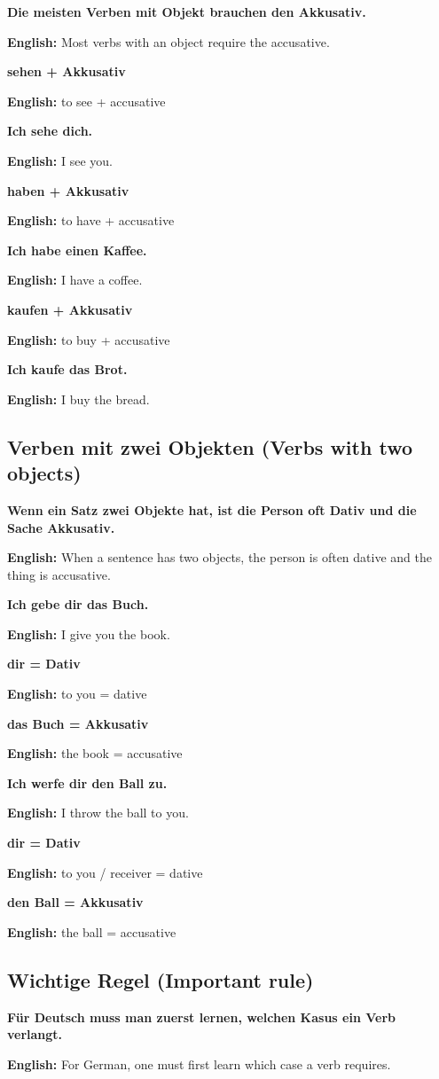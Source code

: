 \documentclass[a4paper,11pt]{article}
\newcommand{\EnglishText}[1]{{\small\color{SoftGray}\textbf{English: }#1\par}}
\newcommand{\EN}[1]{\EnglishText{#1}}
\begin{document}
            \textbf{Die meisten Verben mit Objekt brauchen den Akkusativ.}
            \EN{Most verbs with an object require the accusative.}
            
            \textbf{sehen + Akkusativ}
            \EN{to see + accusative}
            
            \textbf{Ich sehe dich.}
            \EN{I see you.}
            
            \textbf{haben + Akkusativ}
            \EN{to have + accusative}
            
            \textbf{Ich habe einen Kaffee.}
            \EN{I have a coffee.}
            
            \textbf{kaufen + Akkusativ}
            \EN{to buy + accusative}
            
            \textbf{Ich kaufe das Brot.}
            \EN{I buy the bread.}
        
        \subsection{Verben mit zwei Objekten \textnormal{(Verbs with two objects)}}
            
            \textbf{Wenn ein Satz zwei Objekte hat, ist die Person oft Dativ und die Sache Akkusativ.}
            \EN{When a sentence has two objects, the person is often dative and the thing is accusative.}
            
            \textbf{Ich gebe dir das Buch.}
            \EN{I give you the book.}
            
            \textbf{dir = Dativ}
            \EN{to you = dative}
            
            \textbf{das Buch = Akkusativ}
            \EN{the book = accusative}
            
            \textbf{Ich werfe dir den Ball zu.}
            \EN{I throw the ball to you.}
            
            \textbf{dir = Dativ}
            \EN{to you / receiver = dative}
            
            \textbf{den Ball = Akkusativ}
            \EN{the ball = accusative}
        
        \subsection{Wichtige Regel \textnormal{(Important rule)}}
            
            \textbf{Für Deutsch muss man zuerst lernen, welchen Kasus ein Verb verlangt.}
            \EN{For German, one must first learn which case a verb requires.}
            
\end{document}
